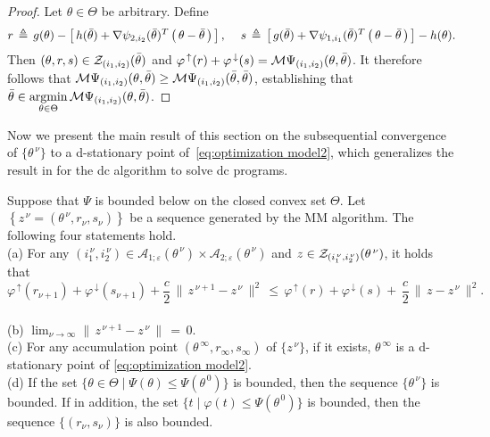 \documentclass{siamart}
\newcommand{\epc}{\hspace{1pc}}
\begin{document}
\begin{proof}
Let $\theta \in \Theta$ be arbitrary.  Define
\[
r \, \triangleq \, g(\theta) - \left[ \, h(\bar{\theta}) + \nabla \psi_{2,i_2}(\bar{\theta})^T \left( \, \theta - \bar{\theta} \, \right) \, \right],\epc
s \, \triangleq \, \left[ \, g(\bar{\theta}) + \nabla \psi_{1,i_1}(\bar{\theta})^T \left( \, \theta - \bar{\theta} \, \right) \, \right] - h(\theta).
\]
Then $( \theta,r,s ) \in {\cal Z}_{(i_1,i_2)}(\bar{\theta})$ and
$\varphi^{\, \uparrow}(r) + \varphi^{\, \downarrow}(s) = {\cal M}\Psi_{(i_1,i_2)}(\theta,\bar{\theta})$.
It therefore follows that ${\cal M}\Psi_{(i_1,i_2)}(\theta,\bar{\theta}) \geq {\cal M}\Psi_{(i_1,i_2)}(\bar{\theta},\bar{\theta})$,
establishing  that $\bar{\theta} \in \displaystyle{
\operatornamewithlimits{\mbox{argmin}}_{\theta \in \Theta}
} \, {\cal M}\Psi_{(i_1, i_2)}(\theta,\bar{\theta})$.
\end{proof}


Now we present the main result of this section on the subsequential convergence of $\{\theta^{\,\nu}\}$  to a d-stationary point
of~\eqref{eq:optimization model2}, which generalizes the result in \cite[Proposition 6]{PangRazaviyaynAlvarado16} for the dc algorithm to solve dc programs.


\begin{proposition}\label{proposition: d-stationary}
Suppose that $\Psi$ is bounded below on the closed convex set $\Theta$.
Let $\left\{ z^{\, \nu} = ( \theta^{\, \nu}, r_\nu, s_\nu) \right\}$ be a sequence generated by the MM algorithm.
The following four statements hold.\\
{\rm (a)} For any
$(i_1^{\,\nu}, i_2^{\,\nu})\in \mathcal{A}_{1;\varepsilon}(\theta^{\,\nu})\times \mathcal{A}_{2;\varepsilon}(\theta^{\,\nu}) $ and
$z \in {\cal Z}_{(i_1^{\,\nu},i_2^{\,\nu})}(\theta^{\, \nu})$,    it holds that
$$\varphi^{\,\uparrow}(r_{\nu+1})+\varphi^{\,\downarrow}(s_{\nu+1})+ \displaystyle\frac{c}{2}\,\|\,z^{\,\nu+1} - z^{\,\nu}\,\|^2 \, \leq \,\varphi^{\, \uparrow}(r) +
\varphi^{\, \downarrow}(s) + \, \displaystyle{
\frac{c}{2}
} \, \| \, z - z^{\, \nu} \, \|^2.$$\\[-0.2in]
{\rm (b)} $\displaystyle\lim_{\nu\to\infty}\|\,z^{\,\nu+1} - z^{\,\nu}\,\|\,=\,0$.\\[0.05in]
{\rm (c)} For any accumulation point $( \theta^{\, \infty},r_{\infty},s_{\infty} )$ of $\{z^{\,\nu}\}$, if it exists,
$\theta^{\, \infty}$ is a d-stationary point of \eqref{eq:optimization model2}.\\[0.05in]
{\rm (d)} If the set $\{ \theta \in \Theta \mid \Psi(\theta) \leq \Psi(\theta^{\, 0}) \}$ is bounded, then the
sequence $\{ \theta^{\, \nu} \}$ is bounded. If in addition, the set $\{ t \mid \varphi(t) \leq \Psi(\theta^{\, 0}) \}$
is bounded, then the sequence $\{ ( r_{\nu},s_{\nu} ) \}$ is also bounded.
\end{proposition}
\end{document}
